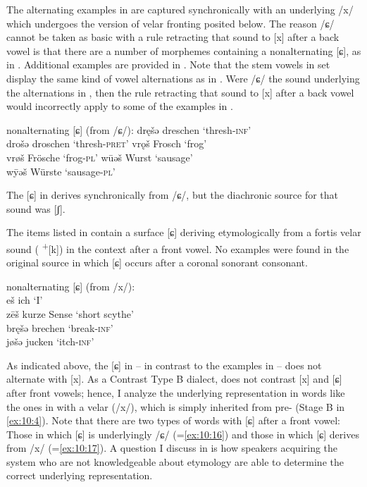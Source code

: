 The alternating examples in  are captured synchronically with an underlying /x/ which undergoes the version of velar fronting posited below. The reason /ɕ/ cannot be taken as basic with a rule retracting that sound to [x] after a back vowel is that there are a number of morphemes containing a nonalternating [ɕ], as in . Additional examples are provided in . Note that the stem vowels in  set display the same kind of vowel alternations as in . Were /ɕ/ the sound underlying the alternations in , then the rule retracting that sound to [x] after a back vowel would incorrectly apply to some of the examples in .\pagebreak

\ea%
\label{ex:10:16} nonalternating [ɕ] (from /ɕ/):
\ea\label{ex:10:16a} dręšǝ \tab [drɛɕǝ] \tab dreschen \tab ‘thresh-\textsc{inf}’ \\
    drošǝ \tab [droɕǝ] \tab droschen \tab ‘thresh-\textsc{pret}’ 
\ex\label{ex:10:16b} vrǫš \tab [vrɔɕ] \tab Frosch \tab ‘frog’ \\
    vrøš \tab [vrøɕ] \tab Frösche \tab ‘frog-\textsc{pl}’ 
\ex\label{ex:10:16c} wūǝš \tab [βuːǝɕ] \tab Wurst \tab ‘sausage’ \\
    w\={y}ǝš \tab [βyːǝɕ] \tab Würste \tab ‘sausage-\textsc{pl}’ 
   \z
\z 

The [ɕ] in  derives synchronically from /ɕ/, but the diachronic source for that sound was [ʃ].

The items listed in  contain a surface [ɕ] deriving etymologically from a fortis velar sound ( \textsuperscript{+}[k]) in the context after a front vowel. No examples were found in the original source in which [ɕ] occurs after a coronal sonorant consonant.

\ea%
\label{ex:10:17}  nonalternating [ɕ] (from /x/):\\
  eš \tab [eɕ] \tab ich \tab ‘I’ \\
  zēš \tab [zeːɕ] \tab kurze Sense \tab ‘short scythe’ \\
  bręšǝ \tab [brɛɕǝ] \tab brechen \tab ‘break-\textsc{inf}’ \\
  jøšǝ \tab [ʝøɕǝ] \tab jucken \tab ‘itch-\textsc{inf}’ 
\z 

As indicated above, the [ɕ] in  -- in contrast to the examples in  -- does not alternate with [x]. As a Contrast Type B dialect,  does not contrast [x] and [ɕ] after front vowels; hence, I analyze the underlying representation in words like the ones in  with a velar (/x/), which is simply inherited from pre- (Stage B in \ref{ex:10:4}). Note that there are two types of words with [ɕ] after a front vowel: Those in which [ɕ] is underlyingly /ɕ/ (=\ref{ex:10:16}) and those in which [ɕ] derives from /x/ (=\ref{ex:10:17}). A question I discuss in  is how speakers acquiring the  system who are not knowledgeable about etymology are able to determine the correct underlying representation.

